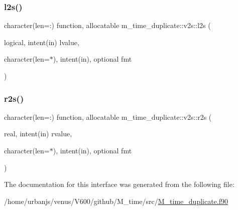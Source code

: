 \mbox{\label{interfacem__time__duplicate_1_1v2s_ae0e736d40ed72468d824df5b0b70ea66}} 
\subsubsection{\texorpdfstring{l2s()}{l2s()}}
{\footnotesize\ttfamily character(len=\+:) function, allocatable m\+\_\+time\+\_\+duplicate\+::v2s\+::l2s (\begin{DoxyParamCaption}\item[{logical, intent(in)}]{lvalue,  }\item[{character(len=$\ast$), intent(in), optional}]{fmt }\end{DoxyParamCaption})}

\mbox{\label{interfacem__time__duplicate_1_1v2s_aef0eec8516ef796d42f060d25c7e9dc3}} 
\subsubsection{\texorpdfstring{r2s()}{r2s()}}
{\footnotesize\ttfamily character(len=\+:) function, allocatable m\+\_\+time\+\_\+duplicate\+::v2s\+::r2s (\begin{DoxyParamCaption}\item[{real, intent(in)}]{rvalue,  }\item[{character(len=$\ast$), intent(in), optional}]{fmt }\end{DoxyParamCaption})}



The documentation for this interface was generated from the following file\+:\begin{DoxyCompactItemize}
\item 
/home/urbanjs/venus/\+V600/github/\+M\+\_\+time/src/\mbox{\hyperlink{M__time__duplicate_8f90}{M\+\_\+time\+\_\+duplicate.\+f90}}\end{DoxyCompactItemize}
